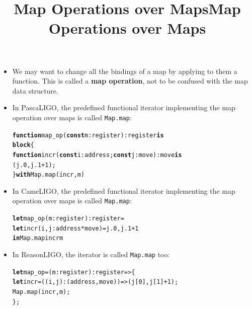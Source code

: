 \documentclass[wide]{slides}
\newcommand{\Kblock}[0]{\textbf{block}\xspace}
\newcommand{\Kconst}[0]{\textbf{const}\xspace}
\newcommand{\Kfunction}[0]{\textbf{function}\xspace}
\newcommand{\Kin}[0]{\textbf{in}\xspace}
\newcommand{\Kis}[0]{\textbf{is}\xspace}
\newcommand{\Kwith}[0]{\textbf{with}\xspace}
\newcommand{\Klet}[0]{\textbf{let}\xspace}
\begin{document}
\begin{slide}
  \title{Map Operations over Maps}

  \begin{itemize}

    \item We may want to change all the bindings of a map by applying
      to them a function. This is called a \textbf{map operation}, not
      to be confused with the map data structure.

    \item In PascaLIGO, the predefined functional iterator
      implementing the map operation over maps is called
      \texttt{Map.map}:
      \begin{alltt}
\Kfunction map_op (\Kconst m : register) : register \Kis
  \Kblock \{
    \Kfunction incr (\Kconst i : address; \Kconst j : move) : move \Kis
      (j.0, j.1 + 1);
  \} \Kwith Map.map (incr, m)
      \end{alltt}

  \end{itemize}

\end{slide}

\begin{slide}
  \title{Map Operations over Maps}

  \begin{itemize}

    \item In CameLIGO, the predefined functional iterator implementing
      the map operation over maps is called \texttt{Map.map}:
      \begin{alltt}
\Klet map_op (m : register) : register =
  \Klet incr (i,j : address * move) = j.0, j.1 + 1
  \Kin Map.map incr m
      \end{alltt}

    \item In ReasonLIGO, the iterator is called \texttt{Map.map} too:
      \begin{alltt}
\Klet map_op = (m : register) : register => \{
  \Klet incr = ((i,j): (address, move)) => (j[0], j[1] + 1);
  Map.map (incr, m);
\};
      \end{alltt}

  \end{itemize}

\end{slide}
\end{document}
